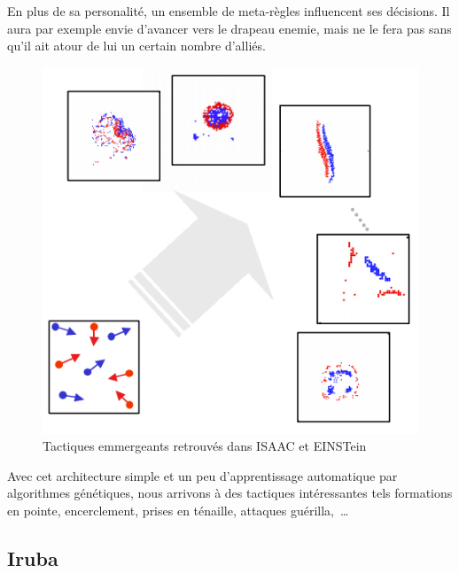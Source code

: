 \documentclass{article}
\begin{document}
En plus de sa personalité, un ensemble de \og{}meta-règles\fg{} influencent ses décisions. Il aura par exemple envie d'avancer vers le drapeau enemie, mais ne le fera pas sans qu'il ait atour de lui un certain nombre d'alliés.

\begin{figure}[H]
	\begin{center}
	\includegraphics[width=0.8\linewidth]{../ressources/einstein_global_behavior}
	\caption{Tactiques emmergeants retrouvés dans ISAAC et EINSTein}
	\end{center}
\end{figure}

Avec cet architecture simple et un peu d'apprentissage automatique par algorithmes génétiques, nous arrivons à des tactiques intéressantes tels formations en pointe, encerclement, prises en ténaille, attaques guérilla,~\dots

\subsection{Iruba}
\end{document}
